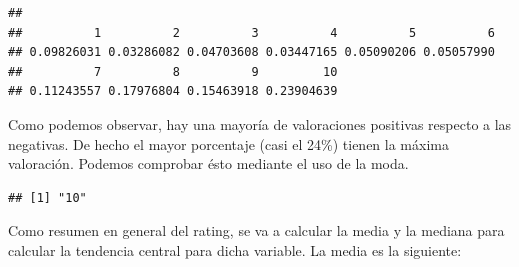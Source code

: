 \documentclass[spanish,]{article}
\newenvironment{Shaded}{\begin{snugshade}}{\end{snugshade}}
\newcommand{\KeywordTok}[1]{\textcolor[rgb]{0.13,0.29,0.53}{\textbf{#1}}}
\newcommand{\DecValTok}[1]{\textcolor[rgb]{0.00,0.00,0.81}{#1}}
\newcommand{\StringTok}[1]{\textcolor[rgb]{0.31,0.60,0.02}{#1}}
\newcommand{\CommentTok}[1]{\textcolor[rgb]{0.56,0.35,0.01}{\textit{#1}}}
\newcommand{\ControlFlowTok}[1]{\textcolor[rgb]{0.13,0.29,0.53}{\textbf{#1}}}
\newcommand{\OperatorTok}[1]{\textcolor[rgb]{0.81,0.36,0.00}{\textbf{#1}}}
\newcommand{\NormalTok}[1]{#1}
\begin{document}
\begin{Shaded}
\end{Shaded}

\begin{verbatim}
## 
##          1          2          3          4          5          6 
## 0.09826031 0.03286082 0.04703608 0.03447165 0.05090206 0.05057990 
##          7          8          9         10 
## 0.11243557 0.17976804 0.15463918 0.23904639
\end{verbatim}

Como podemos observar, hay una mayoría de valoraciones positivas
respecto a las negativas. De hecho el mayor porcentaje (casi el 24\%)
tienen la máxima valoración. Podemos comprobar ésto mediante el uso de
la moda.

\begin{Shaded}
\end{Shaded}

\begin{verbatim}
## [1] "10"
\end{verbatim}

Como resumen en general del rating, se va a calcular la media y la
mediana para calcular la tendencia central para dicha variable. La media
es la siguiente:

\begin{Shaded}
\end{Shaded}
\end{document}
